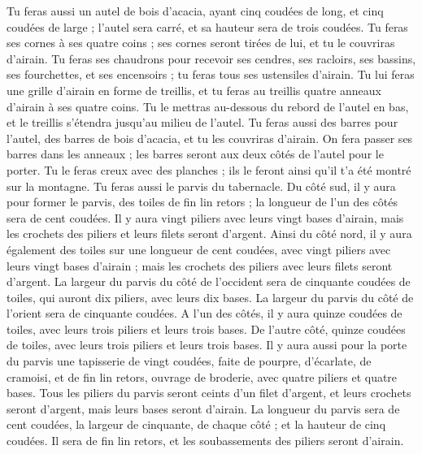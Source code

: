 \begin{multicols}{2}
\VerseOne{}Tu feras aussi un autel de bois d’acacia, ayant cinq coudées de long, et cinq coudées de large ; l'autel sera carré, et sa hauteur sera de trois coudées.
Tu feras ses cornes à ses quatre coins ; ses cornes seront tirées de lui, et tu le couvriras d'airain.
Tu feras ses chaudrons pour recevoir ses cendres, ses racloirs, ses bassins, ses fourchettes, et ses encensoirs ; tu feras tous ses ustensiles d'airain.
Tu lui feras une grille d'airain en forme de treillis, et tu feras au treillis quatre anneaux d'airain à ses quatre coins.
Tu le mettras au-dessous du rebord de l'autel en bas, et le treillis s'étendra jusqu'au milieu de l'autel.
Tu feras aussi des barres pour l'autel, des barres de bois d’acacia, et tu les couvriras d'airain.
On fera passer ses barres dans les anneaux ; les barres seront aux deux côtés de l'autel pour le porter.
Tu le feras creux avec des planches ; ils le feront ainsi qu'il t'a été montré sur la montagne.
Tu feras aussi le parvis du tabernacle. Du côté sud, il y aura pour former le parvis, des toiles de fin lin retors ; la longueur de l'un des côtés sera de cent coudées.
Il y aura vingt piliers avec leurs vingt bases d'airain, mais les crochets des piliers et leurs filets seront d'argent.
Ainsi du côté nord, il y aura également des toiles sur une longueur de cent coudées, avec vingt piliers avec leurs vingt bases d'airain ; mais les crochets des piliers avec leurs filets seront d'argent.
La largeur du parvis du côté de l'occident sera de cinquante coudées de toiles, qui auront dix piliers, avec leurs dix bases.
La largeur du parvis du côté de l'orient sera de cinquante coudées.
A l'un des côtés, il y aura quinze coudées de toiles, avec leurs trois piliers et leurs trois bases.
De l'autre côté, quinze coudées de toiles, avec leurs trois piliers et leurs trois bases.
Il y aura aussi pour la porte du parvis une tapisserie de vingt coudées, faite de pourpre, d'écarlate, de cramoisi, et de fin lin retors, ouvrage de broderie, avec quatre piliers et quatre bases.
Tous les piliers du parvis seront ceints d'un filet d'argent, et leurs crochets seront d'argent, mais leurs bases seront d'airain.
La longueur du parvis sera de cent coudées, la largeur de cinquante, de chaque côté ; et la hauteur de cinq coudées. Il sera de fin lin retors, et les soubassements des piliers seront d'airain.

\end{multicols}
